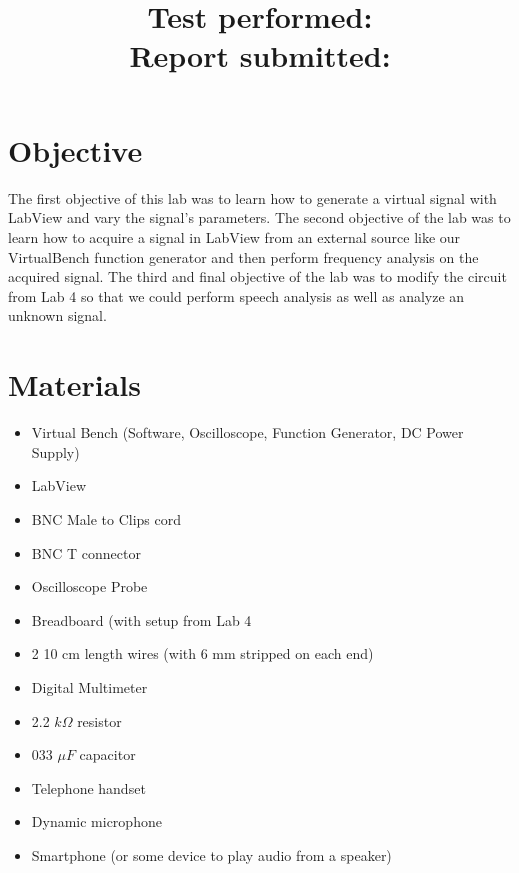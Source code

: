 \documentclass[10pt]{article}
\title{
    \textbf{\courseTitle} \\
    \textbf{\documentTitle} \\
    \bigskip
    \textbf{\large{Test performed: \testDate}} \\
    \textbf{\large{Report submitted: \reportDate}} \\
    \bigskip
    \bigskip
}
\author{\documentAuthor}
\date{}
\begin{document}
\maketitle

\newpage

\section{Objective}

The first objective of this lab was to learn how to generate a virtual signal with LabView and vary the signal's parameters. The second objective of the lab was to learn how to acquire a signal in LabView from an external source like our VirtualBench function generator and then perform frequency analysis on the acquired signal. The third and final objective of the lab was to modify the circuit from Lab 4 so that we could perform speech analysis as well as analyze an unknown signal. 

\medskip



\section{Materials}

\begin{itemize}
	\item Virtual Bench (Software, Oscilloscope, Function Generator, DC Power Supply)
	\item LabView
	\item BNC Male to Clips cord
	\item BNC T connector
	\item Oscilloscope Probe
	\item Breadboard (with setup from Lab 4
	\item 2 10 cm length wires (with 6 mm stripped on each end)
	\item Digital Multimeter
	\item 2.2 $k\Omega$ resistor
	\item 033 $\mu F$ capacitor
	\item Telephone handset
	\item Dynamic microphone
	\item Smartphone (or some device to play audio from a speaker)
	
\end{itemize}
\end{document}
